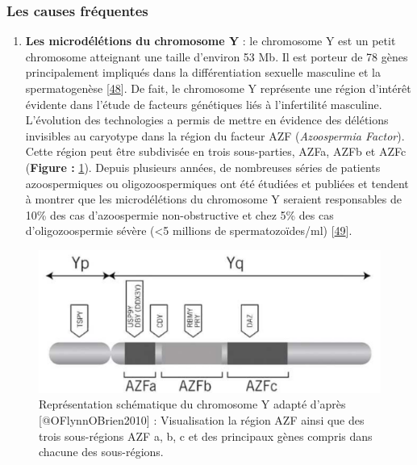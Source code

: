 \documentclass[12pt,twoside]{reedthesis}
\providecommand{\tightlist}{%
  \setlength{\itemsep}{0pt}\setlength{\parskip}{0pt}}
\theoremstyle{definition}
\theoremstyle{definition}
\theoremstyle{remark}
\begin{document}
  \subsubsection{Les causes fréquentes}\label{les-causes-frequentes}
  
  \begin{enumerate}
  \def\labelenumi{\arabic{enumi}.}
  \tightlist
  \item
    \textbf{Les microdélétions du chromosome Y} : le chromosome Y est un
    petit chromosome atteignant une taille d'environ 53 Mb. Il est porteur
    de 78 gènes principalement impliqués dans la différentiation sexuelle
    masculine et la spermatogenèse
    {[}\protect\hyperlink{ref-Skaletsky2003}{48}{]}. De fait, le
    chromosome Y représente une région d'intérêt évidente dans l'étude de
    facteurs génétiques liés à l'infertilité masculine. L'évolution des
    technologies a permis de mettre en évidence des délétions invisibles
    au caryotype dans la région du facteur AZF (\emph{Azoospermia
    Factor}). Cette région peut être subdivisée en trois sous-parties,
    AZFa, AZFb et AZFc (\textbf{Figure :} \ref{fig:chry}). Depuis
    plusieurs années, de nombreuses séries de patients azoospermiques ou
    oligozoospermiques ont été étudiées et publiées et tendent à montrer
    que les microdélétions du chromosome Y seraient responsables de 10\%
    des cas d'azoospermie non-obstructive et chez 5\% des cas
    d'oligozoospermie sévère (\textless{}5 millions de spermatozoïdes/ml)
    {[}\protect\hyperlink{ref-Hotaling2014}{49}{]}.
  \end{enumerate}
  
  \newpage
  
  \begin{figure}
  
  {\centering \includegraphics[scale=.45]{figure/chromozomeY} 
  
  }
  
  \caption[Représentation schématique du chromosome Y adapté]{Représentation schématique du chromosome Y adapté d'après [@OFlynnOBrien2010] : Visualisation la région AZF ainsi que des trois sous-régions AZF a, b, c et des principaux gènes compris dans chacune des sous-régions.}\label{fig:chry}
  \end{figure}
  
\end{document}
